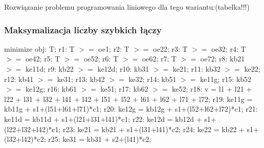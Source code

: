 \documentclass[a4paper,11pt, titlepage]{article}
\begin{document}
Rozwiązanie problemu programowania liniowego dla tego wariantu:(tabelka!!!)

\subsubsection{Maksymalizacja liczby szybkich łączy}

\begin{flushleft}
minimize obj: T;\linebreak
\linebreak
r1: T $>=$ oe1;\linebreak
r2: T $>=$ oe22;\linebreak
r3: T $>=$ oe32;\linebreak
r4: T $>=$ oe42;\linebreak
r5: T $>=$ oe52;\linebreak
r6: T $>=$ oe62;\linebreak
r7: T $>=$ oe72;\linebreak
\linebreak
r8: kb21 $>=$ ke11d;\linebreak
r9: kb22 $>=$ ke12d;\linebreak
r10: kb31 $>=$ ke21;\linebreak
r11: kb32 $>=$ ke22;\linebreak
r12: kb41 $>=$ ke31;\linebreak
r13: kb42 $>=$ ke32;\linebreak
r14: kb51 $>=$ ke11g;\linebreak
r15: kb52 $>=$ ke12g;\linebreak
r16: kb61 $>=$ ke51;\linebreak
r17: kb62 $>=$ ke52;\linebreak
\linebreak
r18: v = l1 + l21 + l22 + l31 + l32 + l41 + l42 + l51 + l52 + l61 + l62 + l71 + l72;\linebreak
\linebreak
r19: ke11g = kb11g + s1+(l51+l61+l71)*c1;\linebreak
r20: ke12g = kb12g + s1+(l52+l62+l72)*c1;\linebreak
r21: ke11d = kb11d + s1+(l21+l31+l41)*c1;\linebreak
r22: ke12d = kb12d + s1+(l22+l32+l42)*c1;\linebreak
r23: ke21 = kb21 + s1+(l31+l41)*c2;\linebreak
r24: ke22 = kb22 + s1+(l32+l42)*c2;\linebreak
r25: ke31 = kb31 + s2+(l41)*c2;\linebreak

\end{flushleft}
\end{document}
